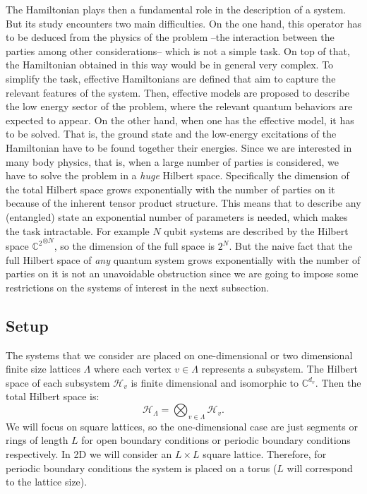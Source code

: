 \documentclass[smallextended]{svjour3}
\renewcommand{\1}{\mathbbm{1}}
\begin{document}
The Hamiltonian plays then a fundamental role in the description of a system. But its study encounters two main difficulties. On the one hand, this operator has to be deduced from the physics of the problem --the interaction between the parties among other considerations-- which is not a simple task. On top of that, the Hamiltonian obtained in this way would be in general very complex. To simplify the task, effective Hamiltonians are defined that aim to capture the relevant features of the system. Then, effective models are proposed to describe the low energy sector of the problem,  where the relevant quantum behaviors are expected to appear. On the other hand, when one has the effective model, it has to be solved. That is, the ground state and the low-energy excitations of the Hamiltonian have to be found  together their energies. Since we are interested in many body physics, that is, when a large number of parties is considered, we have to solve the problem in a \emph{huge} Hilbert space. Specifically the dimension of the total Hilbert space grows exponentially with the number of parties on it because of the inherent tensor product structure. This means that to describe any (entangled) state an exponential number of parameters is needed, which makes the task intractable. For example $N$ qubit systems are described by the Hilbert space ${\mathbb{C}^{2}}^{ \otimes N}$, so the dimension of the full space is $2^N$. But the naive fact that the full Hilbert space of \emph{any} quantum system grows exponentially with the number of parties on it is not an unavoidable obstruction since we are going to impose some restrictions on the systems of interest in the next subsection.

\subsection{Setup}

The systems that we consider are placed on one-dimensional or two dimensional finite size lattices $\Lambda$ where each vertex $v\in\Lambda$ represents a subsystem. The Hilbert space of each subsystem $\mathcal{H}_v$ is finite dimensional and isomorphic to $\mathbb{C}^{d_v}$. Then the total Hilbert space is:
$$\mathcal{H}_\Lambda=\bigotimes_{v\in \Lambda} \mathcal{H}_v. $$
We will focus on square lattices, so the one-dimensional case are just segments or rings of length $L$ for open boundary conditions or periodic boundary conditions respectively. In 2D we will consider an $L\times L$ square lattice. Therefore, for periodic boundary conditions  the system is placed on a torus ($L$ will correspond to the lattice size).
\end{document}
